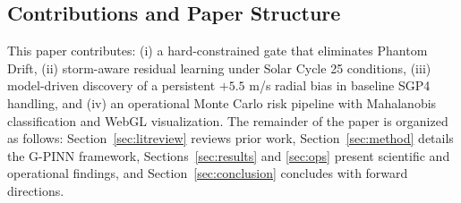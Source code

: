 \subsection{Contributions and Paper Structure}
This paper contributes: (i) a hard-constrained gate that eliminates Phantom Drift, (ii) storm-aware residual learning under Solar Cycle 25 conditions, (iii) model-driven discovery of a persistent $+5.5$ m/s radial bias in baseline SGP4 handling, and (iv) an operational Monte Carlo risk pipeline with Mahalanobis classification and WebGL visualization. The remainder of the paper is organized as follows: Section~\ref{sec:litreview} reviews prior work, Section~\ref{sec:method} details the G-PINN framework, Sections~\ref{sec:results} and \ref{sec:ops} present scientific and operational findings, and Section~\ref{sec:conclusion} concludes with forward directions.